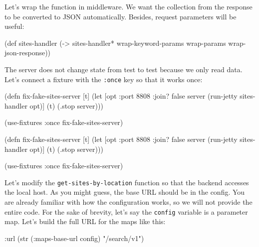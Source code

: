 \fi


Let's wrap the function in middleware. We want the collection from the response to be converted to JSON automatically. Besides, request parameters will be useful:

\begin{english}
  \begin{clojure}
(def sites-handler
  (-> sites-handler*
      wrap-keyword-params
      wrap-params
      wrap-json-response))
  \end{clojure}
\end{english}

The server does not change state from test to test because we only read data. Let's connect a fixture with the \verb|:once| key so that it works once:

\ifnarrow

\begin{english}
  \begin{clojure}
(defn fix-fake-sites-server [t]
  (let [opt {:port 8808 :join? false}
        server (run-jetty
                 sites-handler opt)]
    (t)
    (.stop server)))

(use-fixtures :once
  fix-fake-sites-server)
  \end{clojure}
\end{english}

\else

\begin{english}
  \begin{clojure}
(defn fix-fake-sites-server [t]
  (let [opt {:port 8808 :join? false}
        server (run-jetty sites-handler opt)]
    (t)
    (.stop server)))

(use-fixtures :once fix-fake-sites-server)
  \end{clojure}
\end{english}

\fi



Let's modify the \verb|get-sites-by-location| function so that the backend accesses the local host. As you might guess, the base URL should be in the config. You are already familiar with how the configuration works, so we will not provide the entire code. For the sake of brevity, let's say the \verb|config| variable is a parameter map. Let's build the full URL for the maps like this:

\ifnarrow

\begin{english}
  \begin{clojure}
{:url (str (:maps-base-url config)
        "/search/v1")}
  \end{clojure}
\end{english}


